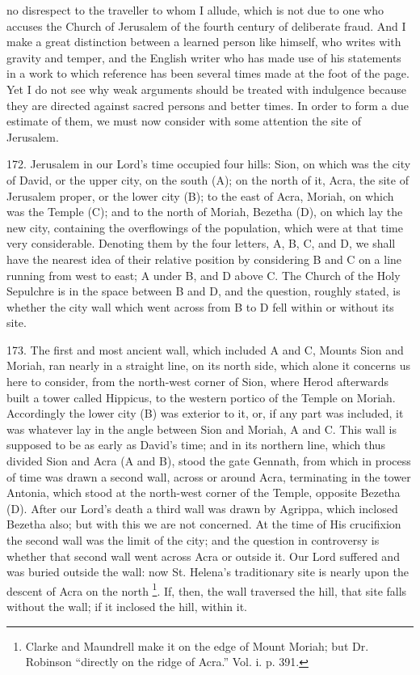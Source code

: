 no disrespect to the traveller to whom I allude, which is not due to
one who accuses the Church of Jerusalem of the fourth century of
deliberate fraud. And I make a great distinction between a learned
person like himself, who writes with gravity and temper, and the
English writer who has made use of his statements in a work to which
reference has been several times made at the foot of the page. Yet I
do not see why weak arguments should be treated with indulgence
because they are directed against sacred persons and better times. In
order to form a due estimate of them, we must now consider with some
attention the site of Jerusalem.

172.
Jerusalem in our Lord's time occupied four hills: Sion, on which was
the city of David, or the upper city, on the south (A); on the north
of it, Acra, the site of Jerusalem proper, or the lower city (B); to
the east of Acra, Moriah, on which was the Temple (C); and to
the north of Moriah, Bezetha (D), on which lay the new city,
containing the overflowings of the population, which were at that time
very considerable. Denoting them by the four letters, A, B, C, and D,
we shall have the nearest idea of their relative position by
considering B and C on a line running from west to east; A under B,
and D above C. The Church of the Holy Sepulchre is in the space
between B and D, and the question, roughly stated, is whether the city
wall which went across from B to D fell within or without its site.

173.
The first and most ancient wall, which included A and C, Mounts Sion
and Moriah, ran nearly in a straight line, on its north side, which
alone it concerns us here to consider, from the north-west corner of
Sion, where Herod afterwards built a tower called Hippicus, to the
western portico of the Temple on Moriah. Accordingly the lower city
(B) was exterior to it, or, if any part was included, it was whatever
lay in the angle between Sion and Moriah, A and C. This wall is
supposed to be as early as David's time; and in its northern line,
which thus divided Sion and Acra (A and B), stood the gate Gennath,
from which in process of time was drawn a second wall, across or
around Acra, terminating in the tower Antonia, which stood at the
north-west corner of the Temple, opposite Bezetha (D). After our Lord's
death a third wall was drawn by Agrippa, which inclosed Bezetha also;
but with this we are not concerned. At the time of His
crucifixion the second wall was the limit of the city; and the
question in controversy is whether that second wall went across Acra
or outside it. Our Lord suffered and was buried outside the wall: now
St. Helena's traditionary site is nearly upon the descent of Acra on
the north \footnote{Clarke and Maundrell make it on the edge of Mount Moriah; but Dr.
Robinson ``directly on the ridge of Acra.'' Vol. i. p. 391.}. If, then,
the wall traversed the hill, that site falls without the wall; if it
inclosed the hill, within it.


